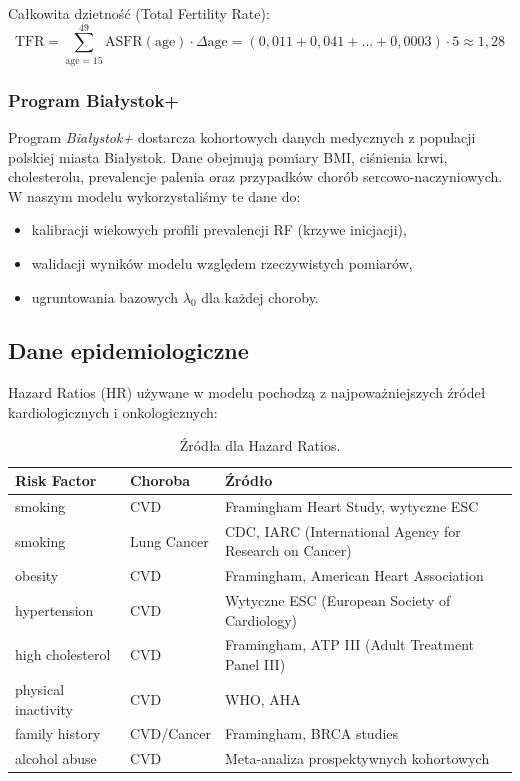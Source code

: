 \documentclass[11pt,a4paper]{article}
\begin{document}
Całkowita dzietność (Total Fertility Rate):
\begin{equation}
\mathrm{TFR} = \sum_{\text{age}=15}^{49} \mathrm{ASFR}(\text{age}) \cdot \Delta \text{age} = (0{,}011 + 0{,}041 + \ldots + 0{,}0003) \cdot 5 \approx 1{,}28
\end{equation}

\subsubsection{Program Białystok+}

Program \emph{Białystok+} dostarcza kohortowych danych medycznych z populacji polskiej miasta Białystok. Dane obejmują pomiary BMI, ciśnienia krwi, cholesterolu, prevalencje palenia oraz przypadków chorób sercowo-naczyniowych. W naszym modelu wykorzystaliśmy te dane do:
\begin{itemize}[leftmargin=*]
  \item kalibracji wiekowych profili prevalencji RF (krzywe inicjacji),
  \item walidacji wyników modelu względem rzeczywistych pomiarów,
  \item ugruntowania bazowych $\lambda_0$ dla każdej choroby.
\end{itemize}

\subsection{Dane epidemiologiczne}

Hazard Ratios (HR) używane w modelu pochodzą z najpoważniejszych źródeł kardiologicznych i onkologicznych:

\begin{table}[h]
\centering
\small
\begin{tabular}{lll}
\toprule
\textbf{Risk Factor} & \textbf{Choroba} & \textbf{Źródło} \\
\midrule
smoking & CVD & Framingham Heart Study, wytyczne ESC \\
smoking & Lung Cancer & CDC, IARC (International Agency for Research on Cancer) \\
obesity & CVD & Framingham, American Heart Association \\
hypertension & CVD & Wytyczne ESC (European Society of Cardiology) \\
high cholesterol & CVD & Framingham, ATP III (Adult Treatment Panel III) \\
physical inactivity & CVD & WHO, AHA \\
family history & CVD/Cancer & Framingham, BRCA studies \\
alcohol abuse & CVD & Meta-analiza prospektywnych kohortowych \\
\bottomrule
\end{tabular}
\caption{Źródła dla Hazard Ratios.}
\end{table}
\end{document}
